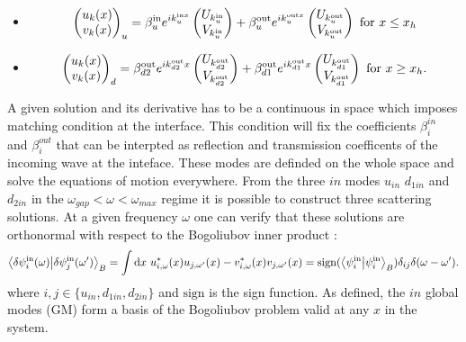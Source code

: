 \begin{itemize}
    
\item\begin{equation}
    \begin{pmatrix}
        u_k(x) \\
        v_k(x)
    \end{pmatrix}_{u} =\beta^{\mathrm{in}}_ue^{{ik_u^{{\mathrm{in}}x}}}\begin{pmatrix}
        U_{k^\mathrm{in}_{u}} \\
        V_{k^\mathrm{in}_{u}}
    \end{pmatrix}
    +
    \beta^{\mathrm{out}}_u e^{ik_u^{{\mathrm{out}}x}}\begin{pmatrix}
        U_{k^\mathrm{out}_{u}} \\
        V_{k^\mathrm{out}_{u}}
    \end{pmatrix} \ \mathrm{for} \ x\leq x_h
\end{equation}  

\item\begin{equation}
    \begin{pmatrix}
        u_k(x) \\
        v_k(x)
    \end{pmatrix}_{d} = \beta^{\mathrm{out}}_{d2} e^{ik^{\mathrm{out}}_{d2}x}
    \begin{pmatrix}
        U_{k^\mathrm{out}_{d2}} \\
        V_{k^\mathrm{out}_{d2}}
    \end{pmatrix} + \beta^{\mathrm{out}}_{d1} e^{ik^{\mathrm{out}}_{d1}x}
    \begin{pmatrix}
        U_{k^\mathrm{out}_{d1}} \\
        V_{k^\mathrm{out}_{d1}} 
    \end{pmatrix} \ \mathrm{for} \ x\geq x_h.
\end{equation}
\end{itemize}

A given solution and its derivative has to be a continuous in space which imposes matching condition at the interface. This condition will fix the coefficients $\beta_i^{in}$ and $\beta_i^{out}$ that can be interpted as reflection and transmission coefficents of the incoming wave at the inteface. 
These modes are definded on the whole space and solve the equations of motion everywhere. From the three $in$ modes $u_{in}$ $d_{1in}$ and $d_{2in}$ in the $\omega_{gap}<\omega<\omega_{max}$ regime it is possible to construct three scattering solutions. At a given frequency $\omega$ one can verify that these solutions are orthonormal with respect to the Bogoliubov inner product :
\begin{equation}
    \bra{\dpsi^\mathrm{in}_i(\omega)}\ket{\dpsi^\mathrm{in}_j(\omega')}_B = \int \mathrm{d}x  \ u^*_{i,\omega}(x)u_{j,\omega'}(x)-v^*_{i,\omega}(x)v_{j,\omega'}(x)  = \mathrm{sign}(\bra{\psi^\mathrm{in}_i}\ket{\psi^\mathrm{in}_i}_B)\delta_{ij}\delta(\omega-\omega').
\end{equation} 
where $i,j \in \{u_{in},d_{1in},d_{2in}\}$ and $\mathrm{sign}$ is the sign function. 
As defined, the $in$ global modes (GM) form a basis of the Bogoliubov problem valid at any $x$ in the system.

